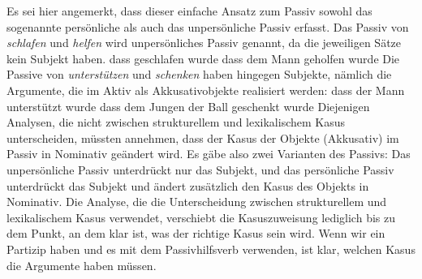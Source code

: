 Es sei hier angemerkt, dass dieser einfache Ansatz zum Passiv sowohl das sogenannte
persönliche als auch das unpersönliche Passiv erfasst. Das Passiv von \emph{schlafen} und \emph{helfen} wird unpersönliches Passiv genannt, da die jeweiligen Sätze kein Subjekt haben. 
\eal
\ex 
dass geschlafen wurde
\ex
dass dem Mann geholfen wurde
\zl
Die Passive von \emph{unterstützen} und \emph{schenken} haben hingegen
Subjekte, nämlich die Argumente, die im Aktiv als Akkusativobjekte realisiert werden:
\eal
\ex 
dass der Mann unterstützt wurde
\ex
dass dem Jungen der Ball geschenkt wurde
\zl
Diejenigen Analysen, die nicht zwischen strukturellem und lexikalischem Kasus unterscheiden, müssten annehmen, dass der Kasus der Objekte
(Akkusativ) im Passiv in Nominativ geändert wird. Es gäbe also zwei Varianten des
Passivs: Das unpersönliche Passiv unterdrückt nur das Subjekt, und das persönliche Passiv unterdrückt das
Subjekt und ändert zusätzlich den Kasus des Objekts in Nominativ. Die Analyse, die die
Unterscheidung zwischen strukturellem und lexikalischem Kasus verwendet, verschiebt die Kasuszuweisung lediglich bis zu dem Punkt, an dem
klar ist, was der richtige Kasus sein wird. Wenn wir ein Partizip haben und es mit dem Passivhilfsverb verwenden, ist
klar, welchen Kasus die Argumente haben müssen.




